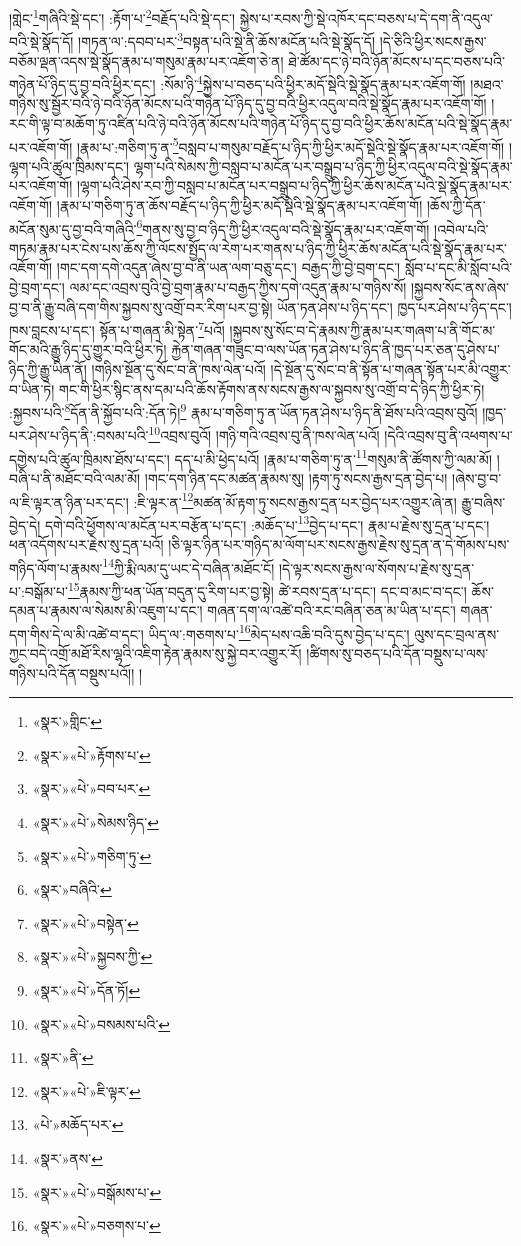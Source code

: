 །གླེང་\footnote{«སྣར་»གླིང་}གཞིའི་སྡེ་དང་། :རྟོག་པ་\footnote{«སྣར་»«པེ་»རྟོགས་པ་}བརྗོད་པའི་སྡེ་དང་། སྐྱེས་པ་རབས་ཀྱི་སྡེ་འཁོར་དང་བཅས་པ་དེ་དག་ནི་འདུལ་བའི་སྡེ་སྣོད་དོ། །གཏན་ལ་:དབབ་པར་\footnote{«སྣར་»«པེ་»བབ་པར་}བསྟན་པའི་སྡེ་ནི་ཆོས་མངོན་པའི་སྡེ་སྣོད་དོ། །དེ་ཅིའི་ཕྱིར་སངས་རྒྱས་བཅོམ་ལྡན་འདས་སྡེ་སྣོད་རྣམ་པ་གསུམ་རྣམ་པར་འཇོག་ཅེ་ན། ཐེ་ཚོམ་དང་ཉེ་བའི་ཉོན་མོངས་པ་དང་བཅས་པའི་གཉེན་པོ་ཉིད་དུ་བྱ་བའི་ཕྱིར་དང་། :སོམ་ཉི་\footnote{«སྣར་»«པེ་»སེམས་ཉིད་}སྐྱེས་པ་བཅད་པའི་ཕྱིར་མདོ་སྡེའི་སྡེ་སྣོད་རྣམ་པར་འཇོག་གོ། །མཐའ་གཉིས་སུ་སྦྱོར་བའི་ཉེ་བའི་ཉོན་མོངས་པའི་གཉེན་པོ་ཉིད་དུ་བྱ་བའི་ཕྱིར་འདུལ་བའི་སྡེ་སྣོད་རྣམ་པར་འཇོག་གོ། །རང་གི་ལྟ་བ་མཆོག་ཏུ་འཛིན་པའི་ཉེ་བའི་ཉོན་མོངས་པའི་གཉེན་པོ་ཉིད་དུ་བྱ་བའི་ཕྱིར་ཆོས་མངོན་པའི་སྡེ་སྣོད་རྣམ་པར་འཇོག་གོ། །རྣམ་པ་:གཅིག་ཏུ་ན་\footnote{«སྣར་»«པེ་»གཅིག་ཏུ་}བསླབ་པ་གསུམ་བརྗོད་པ་ཉིད་ཀྱི་ཕྱིར་མདོ་སྡེའི་སྡེ་སྣོད་རྣམ་པར་འཇོག་གོ། །ལྷག་པའི་ཚུལ་ཁྲིམས་དང་། ལྷག་པའི་སེམས་ཀྱི་བསླབ་པ་མངོན་པར་བསྒྲུབ་པ་ཉིད་ཀྱི་ཕྱིར་འདུལ་བའི་སྡེ་སྣོད་རྣམ་པར་འཇོག་གོ། །ལྷག་པའི་ཤེས་རབ་ཀྱི་བསླབ་པ་མངོན་པར་བསྒྲུབ་པ་ཉིད་ཀྱི་ཕྱིར་ཆོས་མངོན་པའི་སྡེ་སྣོད་རྣམ་པར་འཇོག་གོ། །རྣམ་པ་གཅིག་ཏུ་ན་ཆོས་བརྗོད་པ་ཉིད་ཀྱི་ཕྱིར་མདོ་སྡེའི་སྡེ་སྣོད་རྣམ་པར་འཇོག་གོ། །ཆོས་ཀྱི་དོན་མངོན་སུམ་དུ་བྱ་བའི་གཞིའི་\footnote{«སྣར་»བཞིའི་}གནས་སུ་བྱ་བ་ཉིད་ཀྱི་ཕྱིར་འདུལ་བའི་སྡེ་སྣོད་རྣམ་པར་འཇོག་གོ། །འབེལ་པའི་གཏམ་རྣམ་པར་ངེས་པས་ཆོས་ཀྱི་ལོངས་སྤྱོད་ལ་རེག་པར་གནས་པ་ཉིད་ཀྱི་ཕྱིར་ཆོས་མངོན་པའི་སྡེ་སྣོད་རྣམ་པར་འཇོག་གོ། །གང་དག་དགེ་འདུན་ཞེས་བྱ་བ་ནི་ཡན་ལག་བཅུ་དང་། བརྒྱད་ཀྱི་བྱེ་བྲག་དང་། སློབ་པ་དང་མི་སློབ་པའི་བྱེ་བྲག་དང་། ལམ་དང་འབྲས་བུའི་བྱེ་བྲག་རྣམ་པ་བརྒྱད་ཀྱིས་དགེ་འདུན་རྣམ་པ་གཉིས་སོ། །སྐྱབས་སོང་ནས་ཞེས་བྱ་བ་ནི་རྒྱུ་བཞི་དག་གིས་སྐྱབས་སུ་འགྲོ་བར་རིག་པར་བྱ་སྟེ། ཡོན་ཏན་ཤེས་པ་ཉིད་དང་། ཁྱད་པར་ཤེས་པ་ཉིད་དང་། ཁས་བླངས་པ་དང་། སྟོན་པ་གཞན་མི་སྟེན་\footnote{«སྣར་»«པེ་»བསྟེན་}པའོ། །སྐྱབས་སུ་སོང་བ་དེ་རྣམས་ཀྱི་རྣམ་པར་གཞག་པ་ནི་གོང་མ་གོང་མའི་རྒྱུ་ཉིད་དུ་གྱུར་བའི་ཕྱིར་ཏེ། རྐྱེན་གཞན་གཟུང་བ་ལས་ཡོན་ཏན་ཤེས་པ་ཉིད་ནི་ཁྱད་པར་ཅན་དུ་ཤེས་པ་ཉིད་ཀྱི་རྒྱུ་ཡིན་ནོ། །གཉིས་སྔོན་དུ་སོང་བ་ནི་ཁས་ལེན་པའོ། །དེ་སྔོན་དུ་སོང་བ་ནི་སྟོན་པ་གཞན་སྟོན་པར་མི་འགྱུར་བ་ཡིན་ཏེ། གང་གི་ཕྱིར་སྙིང་ནས་དམ་པའི་ཆོས་རྟོགས་ནས་སངས་རྒྱས་ལ་སྐྱབས་སུ་འགྲོ་བ་དེ་ཉིད་ཀྱི་ཕྱིར་ཏེ། :སྐྱབས་པའི་\footnote{«སྣར་»«པེ་»སྐྱབས་ཀྱི་}དོན་ནི་སྐྱོབ་པའི་:དོན་ཏེ།\footnote{«སྣར་»«པེ་»དོན་ཏོ།} རྣམ་པ་གཅིག་ཏུ་ན་ཡོན་ཏན་ཤེས་པ་ཉིད་ནི་ཐོས་པའི་འབྲས་བུའོ། །ཁྱད་པར་ཤེས་པ་ཉིད་ནི་:བསམ་པའི་\footnote{«སྣར་»«པེ་»བསམས་པའི་}འབྲས་བུའོ། །གཉི་གའི་འབྲས་བུ་ནི་ཁས་ལེན་པའོ། །དེའི་འབྲས་བུ་ནི་འཕགས་པ་དགྱེས་པའི་ཚུལ་ཁྲིམས་ཐོས་པ་དང་། དད་པ་མི་ཕྱེད་པའོ། །རྣམ་པ་གཅིག་ཏུ་ན་\footnote{«སྣར་»ནི་}གསུམ་ནི་ཚོགས་ཀྱི་ལམ་མོ། །བཞི་པ་ནི་མཐོང་བའི་ལམ་མོ། །གང་དག་ཉིན་དང་མཚན་རྣམས་སུ། །རྟག་ཏུ་སངས་རྒྱས་དྲན་བྱེད་པ། །ཞེས་བྱ་བ་ལ་ཇི་ལྟར་ན་ཉིན་པར་དང་། :ཇི་ལྟར་ན་\footnote{«སྣར་»«པེ་»ཇི་ལྟར་}མཚན་མོ་རྟག་ཏུ་སངས་རྒྱས་དྲན་པར་བྱེད་པར་འགྱུར་ཞེ་ན། རྒྱུ་བཞིས་བྱེད་དེ། དགེ་བའི་ཕྱོགས་ལ་མངོན་པར་བརྩོན་པ་དང་། :མཆོད་པ་\footnote{«པེ་»མཆོད་པར་}བྱེད་པ་དང་། རྣམ་པ་རྗེས་སུ་དྲན་པ་དང་། ཕན་འདོགས་པར་རྗེས་སུ་དྲན་པའོ། །ཅི་ལྟར་ཉིན་པར་གཉིད་མ་ལོག་པར་སངས་རྒྱས་རྗེས་སུ་དྲན་ན་དེ་གོམས་པས་གཉིད་ལོག་པ་རྣམས་\footnote{«སྣར་»ནས་}ཀྱི་རྨི་ལམ་དུ་ཡང་དེ་བཞིན་མཐོང་ངོ། །དེ་ལྟར་སངས་རྒྱས་ལ་སོགས་པ་རྗེས་སུ་དྲན་པ་:བསྒོམ་པ་\footnote{«སྣར་»«པེ་»བསྒོམས་པ་}རྣམས་ཀྱི་ཕན་ཡོན་བདུན་དུ་རིག་པར་བྱ་སྟེ། ཚེ་རབས་དྲན་པ་དང་། དང་བ་མང་བ་དང་། ཆོས་དམན་པ་རྣམས་ལ་སེམས་མི་འཇུག་པ་དང་། གཞན་དག་ལ་འཚེ་བའི་རང་བཞིན་ཅན་མ་ཡིན་པ་དང་། གཞན་དག་གིས་དེ་ལ་མི་འཚེ་བ་དང་། ཡིད་ལ་:གཅགས་པ་\footnote{«སྣར་»«པེ་»བཅགས་པ་}མེད་པས་འཆི་བའི་དུས་བྱེད་པ་དང་། ལུས་དང་བྲལ་ནས་ཀྱང་བདེ་འགྲོ་མཐོ་རིས་ལྷའི་འཇིག་རྟེན་རྣམས་སུ་སྐྱེ་བར་འགྱུར་རོ། །ཚིགས་སུ་བཅད་པའི་དོན་བསྡུས་པ་ལས་གཉིས་པའི་དོན་བསྡུས་པའོ།། །
